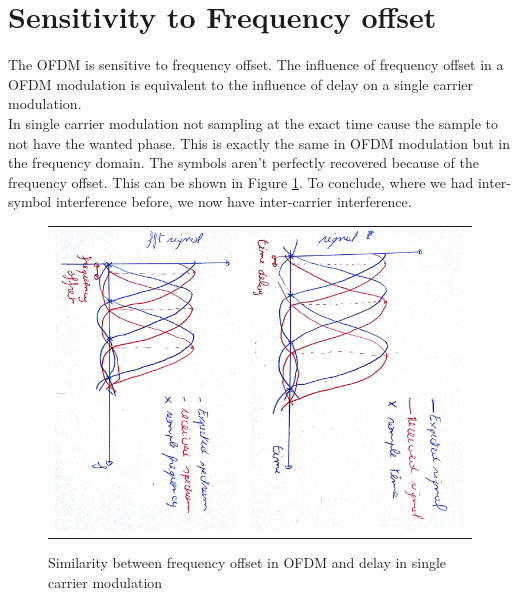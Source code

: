 \documentclass{article}
\begin{document}
\section{Sensitivity to Frequency offset}
    The OFDM is sensitive to frequency offset. The influence of frequency offset in a OFDM modulation is equivalent to the influence of delay on a single carrier modulation. \\
    In single carrier modulation not sampling at the exact time cause the sample to not have the wanted phase. This is exactly the same in OFDM modulation but in the frequency domain. The symbols aren't perfectly recovered because of the frequency offset. This can be shown in Figure \ref{compare}. To conclude, where we had inter-symbol interference before, we now have inter-carrier interference.
    \begin{figure}[h!]
    \centering
    \begin{tabular}{c c}
     \includegraphics[width = 0.3 \textwidth , angle=90]{time.jpg} & \includegraphics[width = 0.3 \textwidth , angle=90]{freq.jpg} \\
    \end{tabular}
    \caption{Similarity between frequency offset in OFDM and delay in single carrier modulation}
    \label{compare}
    \end{figure}
    
\end{document}
